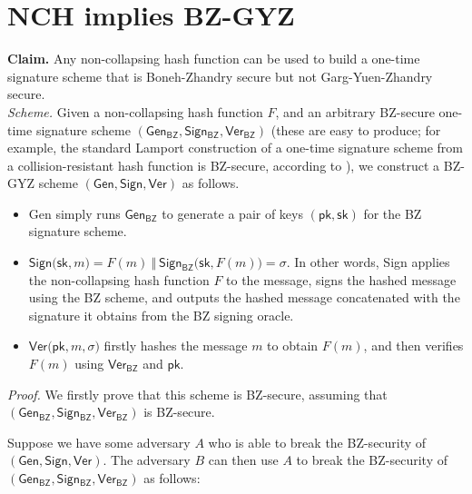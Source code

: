 \documentclass{article}
\begin{document}
\section{NCH implies BZ-GYZ}

\textbf{Claim.} Any non-collapsing hash function can be used to build a one-time signature scheme that is Boneh-Zhandry secure but not Garg-Yuen-Zhandry secure. \\

\noindent \textit{Scheme.} Given a non-collapsing hash function $F$, and an arbitrary BZ-secure one-time signature scheme $\mathsf{(Gen_{BZ}, Sign_{BZ}, Ver_{BZ})}$ (these are easy to produce; for example, the standard Lamport construction of a one-time signature scheme from a collision-resistant hash function is BZ-secure, according to \cite{BZ13b}), we construct a BZ-GYZ scheme $\mathsf{(Gen, Sign, Ver)}$ as follows.

\begin{itemize}
    \item \textsf{Gen} simply runs $\mathsf{Gen_{BZ}}$ to generate a pair of keys $\mathsf{(pk, sk)}$ for the BZ signature scheme.
    \item $\mathsf{Sign(sk}, m\mathsf{)} = F(m) \: \Vert \: \mathsf{Sign_{BZ}(sk}, F(m)\mathsf{)} = \sigma$. In other words, \textsf{Sign} applies the non-collapsing hash function $F$ to the message, signs the hashed message using the BZ scheme, and outputs the hashed message concatenated with the signature it obtains from the BZ signing oracle.
    \item $\mathsf{Ver(pk}, m, \sigma \mathsf{)}$ firstly hashes the message $m$ to obtain $F(m)$, and then verifies $F(m)$ using $\mathsf{Ver_{BZ}}$ and $\mathsf{pk}$.
\end{itemize}

\noindent \textit{Proof.} We firstly prove that this scheme is BZ-secure, assuming that $\mathsf{(Gen_{BZ}, Sign_{BZ}, Ver_{BZ})}$ is BZ-secure.

Suppose we have some adversary $A$ who is able to break the BZ-security of $\mathsf{(Gen, Sign, Ver)}$. The adversary $B$ can then use $A$ to break the BZ-security of $\mathsf{(Gen_{BZ}, Sign_{BZ}, Ver_{BZ})}$ as follows:
\end{document}
